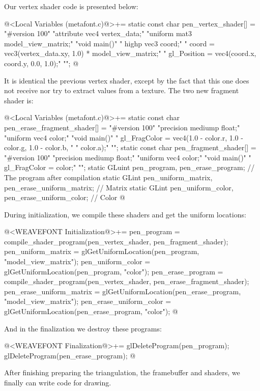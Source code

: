 {{{{{Our vertex shader code is presented below:

\iniciocodigo
@<Local Variables (metafont.c)@>+=
static const char pen_vertex_shader[] =
  "#version 100\n"
  "attribute vec4 vertex_data;\n"
  "uniform mat3 model_view_matrix;\n"
  "void main(){\n"
  "  highp vec3 coord;\n"
  "  coord = vec3(vertex_data.xy, 1.0) * model_view_matrix;\n"
  "  gl_Position = vec4(coord.x, coord.y, 0.0, 1.0);\n"
  "}\n";
@
\fimcodigo

It is identical the previous vertex shader, except by the fact that
this one does not receive nor try to extract values from a
texture. The two new fragment shader is:

\iniciocodigo
@<Local Variables (metafont.c)@>+=
static const char pen_erase_fragment_shader[] =
  "#version 100\n"
  "precision mediump float;\n"
  "uniform vec4 color;\n"
  "void main(){\n"
  "  gl_FragColor = vec4(1.0 - color.r, 1.0 - color.g, 1.0 - color.b, \n"
  "                      color.a);\n"
  "}\n";
static const char pen_fragment_shader[] =
  "#version 100\n"
  "precision mediump float;\n"
  "uniform vec4 color;\n"
  "void main(){\n"
  "  gl_FragColor = color;"
  "}\n";
static GLuint pen_program, pen_erase_program; // The program after compilation
static GLint pen_uniform_matrix, pen_erase_uniform_matrix; // Matrix
static GLint pen_uniform_color, pen_erase_uniform_color; // Color
@
\fimcodigo

During initialization, we compile these shaders and get the uniform
locations:

\iniciocodigo
@<WEAVEFONT Initialization@>+=
{
  pen_program = compile_shader_program(pen_vertex_shader, pen_fragment_shader);
  pen_uniform_matrix = glGetUniformLocation(pen_program, "model_view_matrix");
  pen_uniform_color = glGetUniformLocation(pen_program, "color");
  pen_erase_program = compile_shader_program(pen_vertex_shader,
                                            pen_erase_fragment_shader);
  pen_erase_uniform_matrix = glGetUniformLocation(pen_erase_program,
                                                  "model_view_matrix");
  pen_erase_uniform_color = glGetUniformLocation(pen_erase_program, "color");
}
@
\fimcodigo

And in the finalization we destroy these programs:

\iniciocodigo
@<WEAVEFONT Finalization@>+=
glDeleteProgram(pen_program);
glDeleteProgram(pen_erase_program);
@
\fimcodigo


After finishing preparing the triangulation, the framebuffer and
shaders, we finally can write code for drawing.

}}}}}
